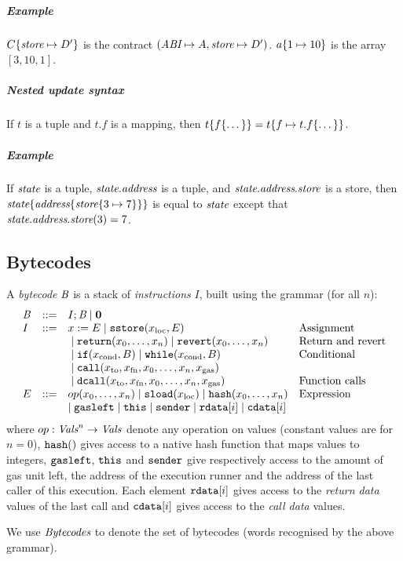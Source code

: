 \documentclass[12pt]{extarticle}
\begin{document}
\subparagraph{Example} $C\{\textit{store}\mapsto D'\}$ is the contract $(\textit{ABI}\mapsto A,\textit{store}\mapsto D')$. $a\{1\mapsto10\}$ is the array $[3,10,1]$.

\subparagraph{Nested update syntax} If $t$ is a tuple and $t.f$ is a mapping, then $t\{f\{\dots\}\} = t\{f\mapsto t.f\{\dots\}\}$.

\subparagraph{Example} If $\textit{state}$ is a tuple, $\textit{state}.\textit{address}$ is a tuple, and $\textit{state}.\textit{address}.\textit{store}$ is a store, then $\textit{state}\{\textit{address}\{\textit{store}\{3 \mapsto 7\}\}\}$ is equal to $\textit{state}$ except that $\textit{state}.\textit{address}.\textit{store}(3) = 7$.

\subsection{Bytecodes}
A \emph{bytecode} $\textit{B}$ is a stack of \emph{instructions} $I$, built using the grammar (for all $n$):
$$\begin{array}{lcll}
\textit{B} &:: =& I ; \textit{B} \mid \mathbf{0} \\
I & :: =& x:=E \mid \mathtt{sstore}(x_\textrm{loc},E) & \hbox{Assignment} \\
&&{}\mid \mathtt{return}(x_0,\dots,x_n) \mid \mathtt{revert}(x_0,\dots,x_n) & \hbox{Return and revert} \\
&& {}\mid \mathtt{if}(x_\textrm{cond}, B) \mid \mathtt{while}(x_\textrm{cond},B)  & \hbox{Conditional}\\
&&{}\mid \mathtt{call}(x_\textrm{to}, x_\textrm{fn}, x_0, \dots, x_n,x_\textrm{gas})\\
&&{}\mid \mathtt{dcall}(x_\textrm{to}, x_\textrm{fn}, x_0, \dots, x_n,x_\textrm{gas})
 & \hbox{Function calls} \\
E & ::= & op(x_0,\dots,x_n)\mid \mathtt{sload}(x_\textrm{loc})\mid\mathtt{hash}(x_0,\dots,x_n) & \hbox{Expression} \\ 
&& \mid \texttt{gasleft} \mid \texttt{this} \mid \mathtt{sender}\mid \mathtt{rdata}[i] \mid\mathtt{cdata}[i] 
\end{array}
$$
where $op:\textit{Vals}^n\to \textit{Vals}$ denote any operation on values (constant values are for $n=0$), $\mathtt{hash}()$ gives access to a native hash function that maps values to integers, 
$\texttt{gasleft}$, $\texttt{this}$ and $\texttt{sender}$ give respectively access to the amount of gas unit left, the address of the execution runner and the address of the last caller of this execution. 
Each element $\mathtt{rdata}[i]$ gives access to the \emph{return data} values of the last call and 
$\mathtt{cdata}[i]$ gives access to the \emph{call data} values.

We use $\textit{Bytecodes}$ to denote the set of bytecodes (words recognised by the above grammar).
\end{document}
